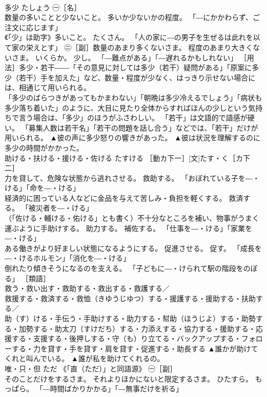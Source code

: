 \documentclass[8pt]{extreport}
\begin{document}
\begin{CJK}{UTF8}{min}
\\	多少	たしょう	㊀［名］ 
\\	数量の多いことと少ないこと。 多いか少ないかの程度。 「―にかかわらず、ご注文に応じます」 
\\	《「少」は助字》多いこと。 たくさん。 「人の家に―の男子を生ぜるは此れを以て家の栄えとす」 ㊁［副］数量のあまり多くないさま。 程度のあまり大きくないさま。 いくらか。 少し。 「―難点がある」「―遅れるかもしれない」 ［用法］多少・若干――「その意見に対しては多少（若干）疑問がある」「原案に多少（若干）手を加えた」など、数量・程度が少なく、はっきり示せない場合には、相通じて用いられる。 
\\	「多少のばらつきがあってもかまわない」「朝晩は多少冷えるでしょう」「病状も多少落ち着いた」のように、大目に見たり全体からすればほんの少しという気持ちで言う場合は、「多少」のほうがふさわしい。 「若干」は文語的で語感が硬い。 「募集人数は若干名」「若干の問題を話し合う」などでは、「若干」だけが用いられる。	▲彼の声に多少怒りの響きがあった。 ▲彼は状況を理解するのに多少の時間がかかった。
\\	助ける・扶ける・援ける・佐ける	たすける	［動カ下一］[文]たす・く［カ下二］ 
\\	力を貸して、危険な状態から逃れさせる。 救助する。 「おぼれている子を―・ける」「命を―・ける」 
\\	経済的に困っている人などに金品を与えて苦しみ・負担を軽くする。 救済する。 「被災者を―・ける」 
\\	（「佐ける・輔ける・佑ける」とも書く）不十分なところを補い、物事がうまく運ぶように手助けする。 助力する。 補佐する。 「仕事を―・ける」「家業を―・ける」 
\\	ある働きがより好ましい状態になるようにする。 促進させる。 促す。 「成長を―・けるホルモン」「消化を―・ける」 
\\	倒れたり傾きそうになるのを支える。 「子どもに―・けられて駅の階段をのぼる」 ［類語］
\\	救う・救い出す・救助する・救出する・救護する／
\\	救援する・救済する・救恤（きゆうじゆつ）する・援護する・援助する・扶助する／
\\	助（す）ける・手伝う・手助けする・助力する・幇助（ほうじよ）する・助勢する・加勢する・助太刀（すけだち）する・力添えする・協力する・援助する・応援する・支援する・後押しする・守（も）り立てる・バックアップする・フォローする・力を貸す・手を貸す・肩を貸す・促進する・助長する	▲誰かが助けてくれと叫んでいる。 ▲誰が私を助けてくれるの。
\\	唯・只・但	ただ	《「直（ただ）」と同語源》 ㊀［副］ 
\\	そのことだけをするさま。 それよりほかにないと限定するさま。 ひたすら。 もっぱら。 「―時間ばかりかかる」「―無事だけを祈る」 

\end{CJK}
\end{document}
